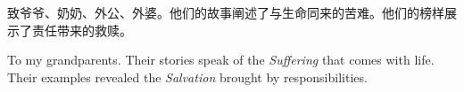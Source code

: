 ﻿\begin{CJK*}{UTF8}{gkai}
\hspace*{2em}致爷爷、奶奶、外公、外婆。他们的故事阐述了与生命同来的苦难。他们的榜样展示了责任带来的救赎。\\
\end{CJK*}

To my grandparents. Their stories speak of the \emph{Suffering} that comes with life. Their examples revealed the \emph{Salvation} brought by responsibilities.
